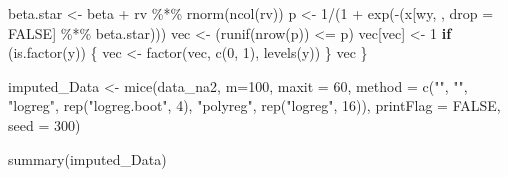 \documentclass[
]{article}
\newenvironment{Shaded}{\begin{snugshade}}{\end{snugshade}}
\newcommand{\AttributeTok}[1]{\textcolor[rgb]{0.77,0.63,0.00}{#1}}
\newcommand{\ConstantTok}[1]{\textcolor[rgb]{0.00,0.00,0.00}{#1}}
\newcommand{\ControlFlowTok}[1]{\textcolor[rgb]{0.13,0.29,0.53}{\textbf{#1}}}
\newcommand{\DecValTok}[1]{\textcolor[rgb]{0.00,0.00,0.81}{#1}}
\newcommand{\FunctionTok}[1]{\textcolor[rgb]{0.00,0.00,0.00}{#1}}
\newcommand{\NormalTok}[1]{#1}
\newcommand{\OtherTok}[1]{\textcolor[rgb]{0.56,0.35,0.01}{#1}}
\newcommand{\SpecialCharTok}[1]{\textcolor[rgb]{0.00,0.00,0.00}{#1}}
\newcommand{\StringTok}[1]{\textcolor[rgb]{0.31,0.60,0.02}{#1}}
\begin{document}
\begin{Shaded}
\begin{Highlighting}[]
\NormalTok{  beta.star }\OtherTok{\textless{}{-}}\NormalTok{ beta }\SpecialCharTok{+}\NormalTok{ rv }\SpecialCharTok{\%*\%} \FunctionTok{rnorm}\NormalTok{(}\FunctionTok{ncol}\NormalTok{(rv))}
\NormalTok{  p }\OtherTok{\textless{}{-}} \DecValTok{1}\SpecialCharTok{/}\NormalTok{(}\DecValTok{1} \SpecialCharTok{+} \FunctionTok{exp}\NormalTok{(}\SpecialCharTok{{-}}\NormalTok{(x[wy, , }\AttributeTok{drop =} \ConstantTok{FALSE}\NormalTok{] }\SpecialCharTok{\%*\%}\NormalTok{ beta.star)))}
\NormalTok{  vec }\OtherTok{\textless{}{-}}\NormalTok{ (}\FunctionTok{runif}\NormalTok{(}\FunctionTok{nrow}\NormalTok{(p)) }\SpecialCharTok{\textless{}=}\NormalTok{ p)}
\NormalTok{  vec[vec] }\OtherTok{\textless{}{-}} \DecValTok{1}
  \ControlFlowTok{if}\NormalTok{ (}\FunctionTok{is.factor}\NormalTok{(y)) \{}
\NormalTok{    vec }\OtherTok{\textless{}{-}} \FunctionTok{factor}\NormalTok{(vec, }\FunctionTok{c}\NormalTok{(}\DecValTok{0}\NormalTok{, }\DecValTok{1}\NormalTok{), }\FunctionTok{levels}\NormalTok{(y))}
\NormalTok{  \}}
\NormalTok{  vec}
\NormalTok{\}}

\NormalTok{imputed\_Data }\OtherTok{\textless{}{-}} \FunctionTok{mice}\NormalTok{(data\_na2, }\AttributeTok{m=}\DecValTok{100}\NormalTok{, }\AttributeTok{maxit =} \DecValTok{60}\NormalTok{, }\AttributeTok{method =} \FunctionTok{c}\NormalTok{(}\StringTok{""}\NormalTok{, }\StringTok{""}\NormalTok{, }\StringTok{"logreg"}\NormalTok{, }\FunctionTok{rep}\NormalTok{(}\StringTok{"logreg.boot"}\NormalTok{, }\DecValTok{4}\NormalTok{), }\StringTok{"polyreg"}\NormalTok{, }
                          \FunctionTok{rep}\NormalTok{(}\StringTok{"logreg"}\NormalTok{, }\DecValTok{16}\NormalTok{)), }\AttributeTok{printFlag =} \ConstantTok{FALSE}\NormalTok{, }\AttributeTok{seed =} \DecValTok{300}\NormalTok{)}

\FunctionTok{summary}\NormalTok{(imputed\_Data)}
\end{Highlighting}
\end{Shaded}
\end{document}

